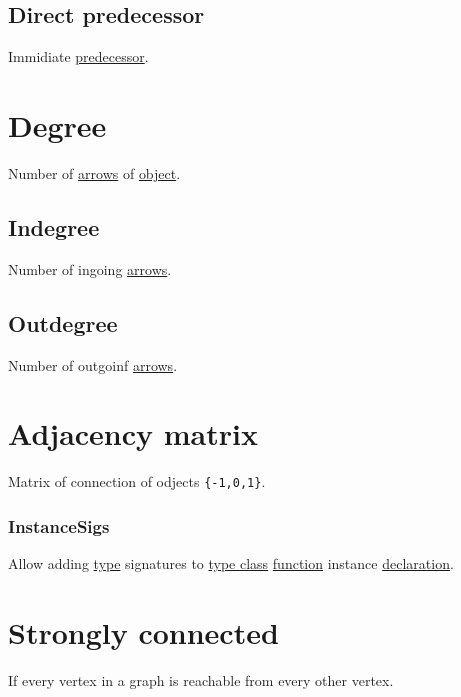 \documentclass[a4paper,14pt,oneside]{book}
\begin{document}
\subsection{\label{orgd3acf73}Direct predecessor}
\label{sec:orgb148b5b}
Immidiate \hyperref[orgb230c32]{predecessor}.\\


\section{\label{orgd384c12}Degree}
\label{sec:orgb3a1a37}
Number of \hyperref[org224bb22]{arrows} of \hyperref[org65d2cb0]{object}.\\

\subsection{\label{org4a485ef}Indegree}
\label{sec:org9959db9}
Number of ingoing \hyperref[org224bb22]{arrows}.\\

\subsection{\label{org2a56893}Outdegree}
\label{sec:org1aa73cd}
Number of outgoinf \hyperref[org224bb22]{arrows}.\\

\section{\label{org9aacb3f}Adjacency matrix}
\label{sec:orgc0148ed}
Matrix of connection of odjects \texttt{\{-1,0,1\}}.\\

\subsubsection{\label{org0a4c91a}InstanceSigs}
\label{sec:org5bd7489}
Allow adding \hyperref[org35b9249]{type} signatures to \hyperref[org735fa3c]{type class} \hyperref[org9530a6b]{function} instance \hyperref[orgd4ba3e1]{declaration}.\\


\section{\label{org5261fe7}Strongly connected}
\label{sec:org9d7472b}
If every vertex in a graph is reachable from every other vertex.\\
\end{document}

